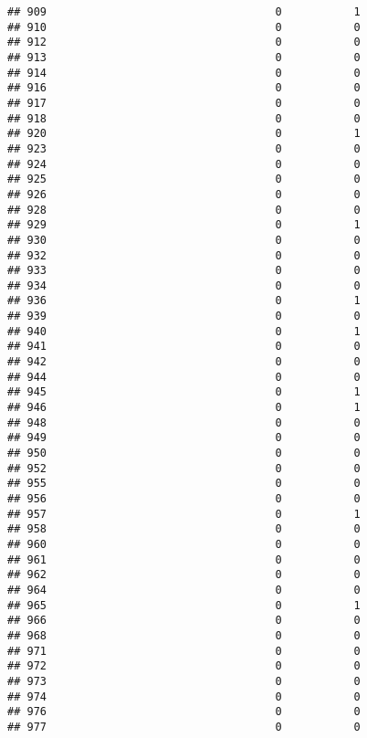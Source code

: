 \documentclass[
]{article}
\begin{document}
\begin{verbatim}
## 909                                   0           1
## 910                                   0           0
## 912                                   0           0
## 913                                   0           0
## 914                                   0           0
## 916                                   0           0
## 917                                   0           0
## 918                                   0           0
## 920                                   0           1
## 923                                   0           0
## 924                                   0           0
## 925                                   0           0
## 926                                   0           0
## 928                                   0           0
## 929                                   0           1
## 930                                   0           0
## 932                                   0           0
## 933                                   0           0
## 934                                   0           0
## 936                                   0           1
## 939                                   0           0
## 940                                   0           1
## 941                                   0           0
## 942                                   0           0
## 944                                   0           0
## 945                                   0           1
## 946                                   0           1
## 948                                   0           0
## 949                                   0           0
## 950                                   0           0
## 952                                   0           0
## 955                                   0           0
## 956                                   0           0
## 957                                   0           1
## 958                                   0           0
## 960                                   0           0
## 961                                   0           0
## 962                                   0           0
## 964                                   0           0
## 965                                   0           1
## 966                                   0           0
## 968                                   0           0
## 971                                   0           0
## 972                                   0           0
## 973                                   0           0
## 974                                   0           0
## 976                                   0           0
## 977                                   0           0

\end{verbatim}
\end{document}
